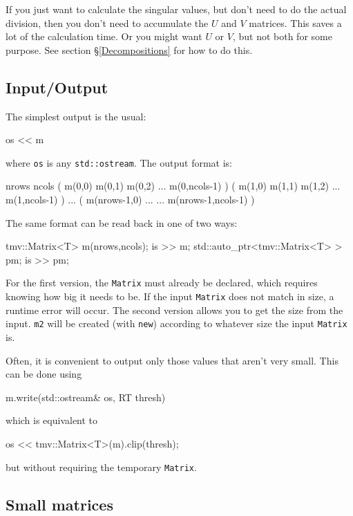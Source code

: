 \documentclass[twoside,letterpaper,11pt]{article}
\renewcommand{\tt}[1]{{\lstinline {#1}}}
\begin{document}
If you just want to calculate the singular values,
but don't need to do the actual division, then you don't need to 
accumulate the $U$ and $V$ matrices.  This saves a lot of the 
calculation time.  Or you might want $U$ or $V$, but not both for 
some purpose.  See section \S\ref{Decompositions} for how to do this.

\subsection{Input/Output}

The simplest output is the usual:
\begin{tmvcode}
os << m
\end{tmvcode}
where \tt{os} is any \tt{std::ostream}.
The output format is:
\begin{tmvcode}
nrows ncols
( m(0,0)  m(0,1)  m(0,2)  ...  m(0,ncols-1) )
( m(1,0)  m(1,1)  m(1,2)  ...  m(1,ncols-1) )
...
( m(nrows-1,0) ...  ...  m(nrows-1,ncols-1) )
\end{tmvcode}
\label{matrixio}

The same format can be read back in one of two ways:
\begin{tmvcode}
tmv::Matrix<T> m(nrows,ncols);
is >> m;
std::auto_ptr<tmv::Matrix<T> > pm;
is >> pm;
\end{tmvcode}
For the first version, the \tt{Matrix} must already be declared, which 
requires knowing how big it needs to be.  If the input \tt{Matrix} does not
match in size, a runtime error will occur.
The second version allows you to get the size from the input.  \tt{m2}
will be created (with \tt{new}) 
according to whatever size the input \tt{Matrix} is.

Often, it is convenient to output only those values that aren't very small. 
This can be done using
\begin{tmvcode}
m.write(std::ostream& os, RT thresh)
\end{tmvcode}
which is equivalent to
\begin{tmvcode}
os << tmv::Matrix<T>(m).clip(thresh);
\end{tmvcode}
but without requiring the temporary \tt{Matrix}.

\subsection{Small matrices}
\label{smallmatrix}
\end{document}
